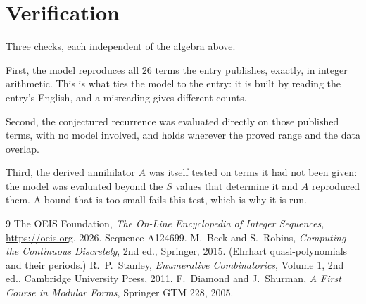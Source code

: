 \documentclass[11pt,a4paper]{article}
\theoremstyle{plain}
\theoremstyle{definition}
\begin{document}
\section{Verification}

Three checks, each independent of the algebra above.

First, the model reproduces all $26$ terms the entry publishes, exactly, in integer
arithmetic. This is what ties the model to the entry: it is built by reading the entry's
English, and a misreading gives different counts.

Second, the conjectured recurrence was evaluated directly on those published terms, with no
model involved, and holds wherever the proved range and the data overlap.

Third, the derived annihilator $A$ was itself tested on terms it had not been given: the model
was evaluated beyond the $S$ values that determine it and $A$ reproduced them. A bound that is
too small fails this test, which is why it is run.

\begin{thebibliography}{9}
 The OEIS Foundation, \emph{The On-Line Encyclopedia of Integer
Sequences}, \url{https://oeis.org}, 2026. Sequence A124699.
 M.~Beck and S.~Robins, \emph{Computing the Continuous Discretely},
2nd ed., Springer, 2015. (Ehrhart quasi-polynomials and their periods.)
 R.~P.~Stanley, \emph{Enumerative Combinatorics}, Volume 1, 2nd ed.,
Cambridge University Press, 2011.
 F.~Diamond and J.~Shurman, \emph{A First Course in Modular Forms},
Springer GTM 228, 2005.
\end{thebibliography}
\end{document}
